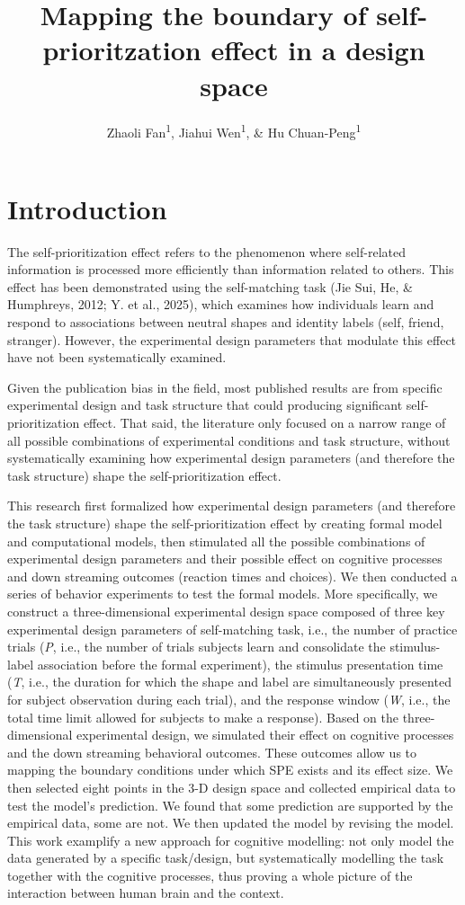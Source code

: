 \documentclass[
  english,
  man,floatsintext]{apa6}
\title{Mapping the boundary of self-prioritzation effect in a design space}
\author{Zhaoli Fan\textsuperscript{1}, Jiahui Wen\textsuperscript{1}, \& Hu Chuan-Peng\textsuperscript{1}}
\date{}
\affiliation{\vspace{0.5cm}\textsuperscript{1} School of Psychology, Nanjing Normal University}
\begin{document}
\maketitle

\section{Introduction}\label{introduction}

The self-prioritization effect refers to the phenomenon where self-related information is processed more efficiently than information related to others. This effect has been demonstrated using the self-matching task (Jie Sui, He, \& Humphreys, 2012; Y. et al., 2025), which examines how individuals learn and respond to associations between neutral shapes and identity labels (self, friend, stranger). However, the experimental design parameters that modulate this effect have not been systematically examined.

Given the publication bias in the field, most published results are from specific experimental design and task structure that could producing significant self-prioritization effect. That said, the literature only focused on a narrow range of all possible combinations of experimental conditions and task structure, without systematically examining how experimental design parameters (and therefore the task structure) shape the self-prioritization effect.

This research first formalized how experimental design parameters (and therefore the task structure) shape the self-prioritization effect by creating formal model and computational models, then stimulated all the possible combinations of experimental design parameters and their possible effect on cognitive processes and down streaming outcomes (reaction times and choices). We then conducted a series of behavior experiments to test the formal models. More specifically, we construct a three-dimensional experimental design space composed of three key experimental design parameters of self-matching task, i.e., the number of practice trials (\emph{P}, i.e., the number of trials subjects learn and consolidate the stimulus-label association before the formal experiment), the stimulus presentation time (\emph{T}, i.e., the duration for which the shape and label are simultaneously presented for subject observation during each trial), and the response window (\emph{W}, i.e., the total time limit allowed for subjects to make a response). Based on the three-dimensional experimental design, we simulated their effect on cognitive processes and the down streaming behavioral outcomes. These outcomes allow us to mapping the boundary conditions under which SPE exists and its effect size. We then selected eight points in the 3-D design space and collected empirical data to test the model's prediction. We found that some prediction are supported by the empirical data, some are not. We then updated the model by revising the model. This work examplify a new approach for cognitive modelling: not only model the data generated by a specific task/design, but systematically modelling the task together with the cognitive processes, thus proving a whole picture of the interaction between human brain and the context.
\end{document}
